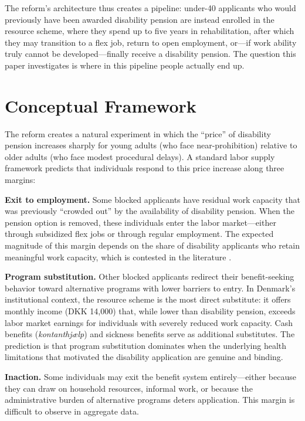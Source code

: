 \documentclass[12pt]{article}
\begin{document}
The reform's architecture thus creates a pipeline: under-40 applicants who would previously have been awarded disability pension are instead enrolled in the resource scheme, where they spend up to five years in rehabilitation, after which they may transition to a flex job, return to open employment, or---if work ability truly cannot be developed---finally receive a disability pension. The question this paper investigates is where in this pipeline people actually end up.


\section{Conceptual Framework}
\label{sec:framework}

The reform creates a natural experiment in which the ``price'' of disability pension increases sharply for young adults (who face near-prohibition) relative to older adults (who face modest procedural delays). A standard labor supply framework predicts that individuals respond to this price increase along three margins:

\textbf{Exit to employment.} Some blocked applicants have residual work capacity that was previously ``crowded out'' by the availability of disability pension. When the pension option is removed, these individuals enter the labor market---either through subsidized flex jobs or through regular employment. The expected magnitude of this margin depends on the share of disability applicants who retain meaningful work capacity, which is contested in the literature \citep{bound1989health, maestas2013does}.

\textbf{Program substitution.} Other blocked applicants redirect their benefit-seeking behavior toward alternative programs with lower barriers to entry. In Denmark's institutional context, the resource scheme is the most direct substitute: it offers monthly income (DKK 14,000) that, while lower than disability pension, exceeds labor market earnings for individuals with severely reduced work capacity. Cash benefits (\textit{kontanthj\ae{}lp}) and sickness benefits serve as additional substitutes. The prediction is that program substitution dominates when the underlying health limitations that motivated the disability application are genuine and binding.

\textbf{Inaction.} Some individuals may exit the benefit system entirely---either because they can draw on household resources, informal work, or because the administrative burden of alternative programs deters application. This margin is difficult to observe in aggregate data.
\end{document}
